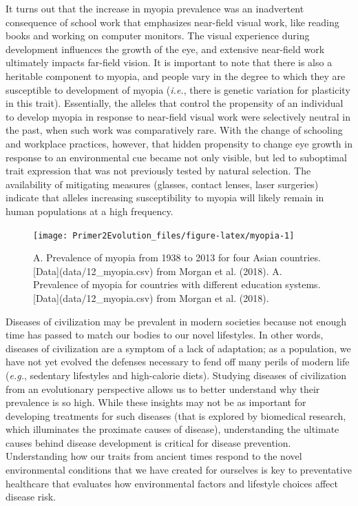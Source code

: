 \documentclass[
]{book}
\begin{document}
It turns out that the increase in myopia prevalence was an inadvertent consequence of school work that emphasizes near-field visual work, like reading books and working on computer monitors. The visual experience during development influences the growth of the eye, and extensive near-field work ultimately impacts far-field vision. It is important to note that there is also a heritable component to myopia, and people vary in the degree to which they are susceptible to development of myopia (\emph{i.e.}, there is genetic variation for plasticity in this trait). Essentially, the alleles that control the propensity of an individual to develop myopia in response to near-field visual work were selectively neutral in the past, when such work was comparatively rare. With the change of schooling and workplace practices, however, that hidden propensity to change eye growth in response to an environmental cue became not only visible, but led to suboptimal trait expression that was not previously tested by natural selection. The availability of mitigating measures (glasses, contact lenses, laser surgeries) indicate that alleles increasing susceptibility to myopia will likely remain in human populations at a high frequency.

\begin{figure}
\texttt{[image: Primer2Evolution\_files/figure-latex/myopia-1]} \caption{A. Prevalence of myopia from 1938 to 2013 for four Asian countries. [Data](data/12_myopia.csv) from Morgan et al. (2018). A. Prevalence of myopia for countries with different education systems. [Data](data/12_myopia.csv) from Morgan et al. (2018).}\label{fig:myopia}
\end{figure}

Diseases of civilization may be prevalent in modern societies because not enough time has passed to match our bodies to our novel lifestyles. In other words, diseases of civilization are a symptom of a lack of adaptation; as a population, we have not yet evolved the defenses necessary to fend off many perils of modern life (\emph{e.g.}, sedentary lifestyles and high-calorie diets). Studying diseases of civilization from an evolutionary perspective allows us to better understand why their prevalence is so high. While these insights may not be as important for developing treatments for such diseases (that is explored by biomedical research, which illuminates the proximate causes of disease), understanding the ultimate causes behind disease development is critical for disease prevention. Understanding how our traits from ancient times respond to the novel environmental conditions that we have created for ourselves is key to preventative healthcare that evaluates how environmental factors and lifestyle choices affect disease risk.
\end{document}
